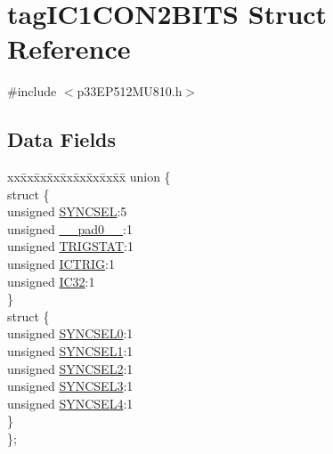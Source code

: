 \hypertarget{structtag_i_c1_c_o_n2_b_i_t_s}{}\section{tag\+I\+C1\+C\+O\+N2\+B\+I\+TS Struct Reference}
\label{structtag_i_c1_c_o_n2_b_i_t_s}


{\ttfamily \#include $<$p33\+E\+P512\+M\+U810.\+h$>$}

\subsection*{Data Fields}
\begin{DoxyCompactItemize}
\item 
\begin{tabbing}
xx\=xx\=xx\=xx\=xx\=xx\=xx\=xx\=xx\=\kill
union \{\\
\>struct \{\\
\>\>unsigned \hyperlink{structtag_i_c1_c_o_n2_b_i_t_s_a35fbbe11485c2615ed27535b62c3fa35}{SYNCSEL}:5\\
\>\>unsigned \hyperlink{structtag_i_c1_c_o_n2_b_i_t_s_adf71f3d8410c1f1dbbc96680a92c49af}{\_\_pad0\_\_}:1\\
\>\>unsigned \hyperlink{structtag_i_c1_c_o_n2_b_i_t_s_ab379549de54ac93ad4aa73686c34cb7c}{TRIGSTAT}:1\\
\>\>unsigned \hyperlink{structtag_i_c1_c_o_n2_b_i_t_s_a79bd14cfd2e403f3a96ce0b3bb58097b}{ICTRIG}:1\\
\>\>unsigned \hyperlink{structtag_i_c1_c_o_n2_b_i_t_s_afc705120246cb4ca0c93c87817519b7f}{IC32}:1\\
\>\} \\
\>struct \{\\
\>\>unsigned \hyperlink{structtag_i_c1_c_o_n2_b_i_t_s_a3b5df3154fde5141e6ac0156425ff8b4}{SYNCSEL0}:1\\
\>\>unsigned \hyperlink{structtag_i_c1_c_o_n2_b_i_t_s_a50e73f95ab1c258ddc64f69c0991deaf}{SYNCSEL1}:1\\
\>\>unsigned \hyperlink{structtag_i_c1_c_o_n2_b_i_t_s_a304907a5d2c4cbf1114a54642a85951e}{SYNCSEL2}:1\\
\>\>unsigned \hyperlink{structtag_i_c1_c_o_n2_b_i_t_s_a6bbd1bd2ead6c9fa713969c6eb0f0c75}{SYNCSEL3}:1\\
\>\>unsigned \hyperlink{structtag_i_c1_c_o_n2_b_i_t_s_a0cd5bbe196c7974953909d27a6307bb7}{SYNCSEL4}:1\\
\>\} \\
\}; \\

\end{tabbing}\end{DoxyCompactItemize}


